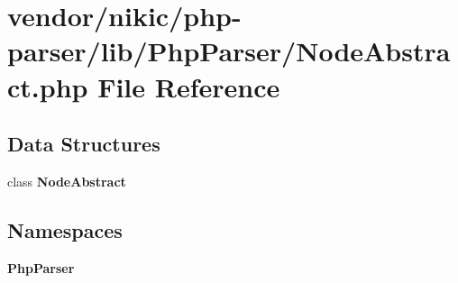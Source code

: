 \section{vendor/nikic/php-\/parser/lib/\+Php\+Parser/\+Node\+Abstract.php File Reference}
\label{_node_abstract_8php}
\subsection*{Data Structures}
\begin{DoxyCompactItemize}
\item 
class {\bf Node\+Abstract}
\end{DoxyCompactItemize}
\subsection*{Namespaces}
\begin{DoxyCompactItemize}
\item 
 {\bf Php\+Parser}
\end{DoxyCompactItemize}

